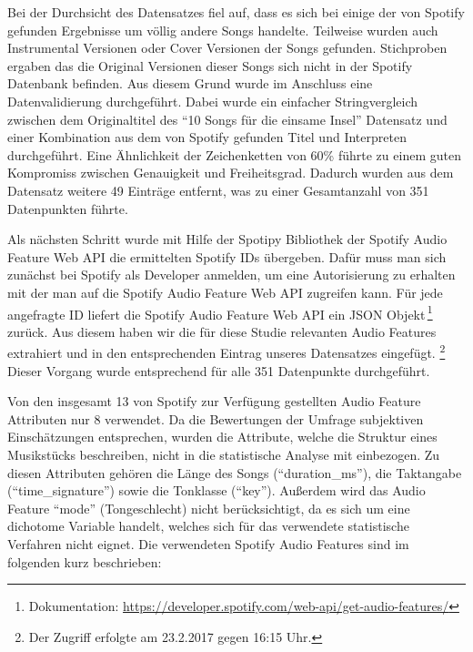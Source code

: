 Bei der Durchsicht des Datensatzes fiel auf, dass es sich bei einige der von Spotify gefunden Ergebnisse um völlig andere Songs handelte.
Teilweise wurden auch Instrumental Versionen oder Cover Versionen der Songs gefunden.
Stichproben ergaben das die Original Versionen dieser Songs sich nicht in der Spotify Datenbank befinden.
Aus diesem Grund wurde im Anschluss eine Datenvalidierung durchgeführt.
Dabei wurde ein einfacher Stringvergleich zwischen dem Originaltitel des "`10 Songs für die einsame Insel"' Datensatz und einer Kombination aus dem von Spotify gefunden Titel und Interpreten durchgeführt.
Eine Ähnlichkeit der Zeichenketten von 60\% führte zu einem guten Kompromiss zwischen Genauigkeit und Freiheitsgrad.
Dadurch wurden aus dem Datensatz weitere 49 Einträge entfernt, was zu einer Gesamtanzahl von 351 Datenpunkten führte.

Als nächsten Schritt wurde mit Hilfe der Spotipy Bibliothek der Spotify Audio Feature Web API die ermittelten Spotify IDs übergeben.
Dafür muss man sich zunächst bei Spotify als Developer anmelden, um eine Autorisierung zu erhalten mit der man auf die Spotify Audio Feature Web API zugreifen kann.
Für jede angefragte ID liefert die Spotify Audio Feature Web API ein JSON Objekt\,\footnote{Dokumentation: \url{https://developer.spotify.com/web-api/get-audio-features/}} zurück.
Aus diesem haben wir die für diese Studie relevanten Audio Features extrahiert und in den entsprechenden Eintrag unseres Datensatzes eingefügt.
\footnote{Der Zugriff erfolgte am 23.2.2017 gegen 16:15 Uhr.}
Dieser Vorgang wurde entsprechend für alle 351 Datenpunkte durchgeführt.

Von den insgesamt 13 von Spotify zur Verfügung gestellten Audio Feature Attributen nur 8 verwendet.
Da die Bewertungen der Umfrage subjektiven Einschätzungen entsprechen, wurden die Attribute, welche die Struktur eines Musikstücks beschreiben, nicht in die statistische Analyse mit einbezogen.
Zu diesen Attributen gehören die Länge des Songs (``duration\_ms''),  die Taktangabe (``time\_signature'') sowie die Tonklasse (``key'').
Außerdem wird das Audio Feature ``mode'' (Tongeschlecht) nicht berücksichtigt, da es sich um eine dichotome Variable handelt, welches sich für das verwendete statistische Verfahren nicht eignet.
Die verwendeten Spotify Audio Features sind im folgenden kurz beschrieben:

